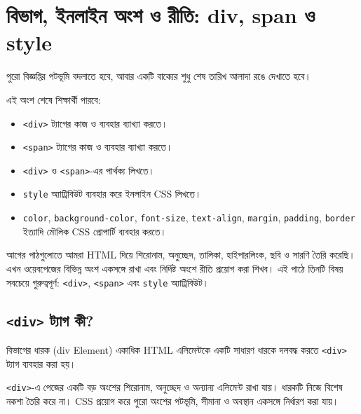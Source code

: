 \section{বিভাগ, ইনলাইন অংশ ও রীতি: div, span ও style}

পুরো বিজ্ঞপ্তির পটভূমি বদলাতে হবে, আবার একটি বাক্যের শুধু শেষ তারিখ আলাদা রঙে দেখাতে হবে।



\begin{learningbox}
এই অংশ শেষে শিক্ষার্থী পারবে:
\begin{itemize}
\item \texttt{<div>} ট্যাগের কাজ ও ব্যবহার ব্যাখ্যা করতে।
\item \texttt{<span>} ট্যাগের কাজ ও ব্যবহার ব্যাখ্যা করতে।
\item \texttt{<div>} ও \texttt{<span>}-এর পার্থক্য লিখতে।
\item \texttt{style} অ্যাট্রিবিউট ব্যবহার করে ইনলাইন CSS লিখতে।
\item \texttt{color}, \texttt{background-color}, \texttt{font-size}, \texttt{text-align}, \texttt{margin}, \texttt{padding}, \texttt{border} ইত্যাদি মৌলিক CSS প্রোপার্টি ব্যবহার করতে।
\end{itemize}
\end{learningbox}



আগের পাঠগুলোতে আমরা HTML দিয়ে শিরোনাম, অনুচ্ছেদ, তালিকা, হাইপারলিংক, ছবি ও সারণি তৈরি করেছি। এখন ওয়েবপেজের বিভিন্ন অংশ একসঙ্গে রাখা এবং নির্দিষ্ট অংশে রীতি প্রয়োগ করা শিখব। এই পাঠে তিনটি বিষয় সবচেয়ে গুরুত্বপূর্ণ: \texttt{<div>}, \texttt{<span>} এবং \texttt{style} অ্যাট্রিবিউট।

\subsection{\texttt{<div>} ট্যাগ কী?}

\begin{definitionbox}{বিভাগের ধারক (div Element)}
একাধিক HTML এলিমেন্টকে একটি সাধারণ ধারকে দলবদ্ধ করতে \texttt{<div>} ট্যাগ ব্যবহার করা হয়।
\end{definitionbox}

\texttt{<div>}-এ পেজের একটি বড় অংশের শিরোনাম, অনুচ্ছেদ ও অন্যান্য এলিমেন্ট রাখা যায়। ধারকটি নিজে বিশেষ নকশা তৈরি করে না। CSS প্রয়োগ করে পুরো অংশের পটভূমি, সীমানা ও অবস্থান একসঙ্গে নির্ধারণ করা যায়।


